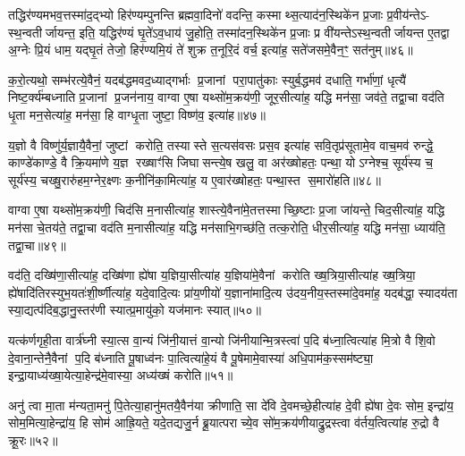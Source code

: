 {\anuvakamend[{निष्क्री॑णीष्व॒ दख्षि॑णाभिश्च वदन्ति॒ मन्य॑न्ते गन्ध॒र्वेभ्यो॑ ब॒हुत॑याः पिङ्गा॒क्ष्या दश॑ च॥६॥}]}

तद्धिर॑ण्यमभव॒त्तस्मा॑द॒द्भ्यो हिर॑ण्यम्पुनन्ति ब्रह्मवा॒दिनो॑ वदन्ति॒ कस्माथ्स॒त्याद॑न॒स्थिके॑न प्र॒जाः प्र॒वीय॑न्तेऽ- स्थ॒न्वतीर्जायन्त॒ इति॒ यद्धिर॑ण्यं घृ॒ते॑ऽव॒धाय॑ जु॒होति॒ तस्मा॑दन॒स्थिके॑न प्र॒जाः प्र वी॑यन्तेऽस्थ॒न्वतीर्जायन्त ए॒तद्वा अ॒ग्नेः प्रि॒यं धाम॒ यद्घृ॒तं तेजो॒ हिर॑ण्यमि॒यं ते॑ शुक्र त॒नूरि॒दं वर्च॒ इत्या॑ह॒ सते॑जसमे॒वैन॒ꣳ॒ सत॑नुम्॥४६॥

क॒रो॒त्यथो॒ सम्भ॑रत्ये॒वैनं॒ यदब॑द्धमवद॒ध्याद्गर्भाः प्र॒जानां परा॒पातु॑काः स्युर्ब॒द्धमव॑ दधाति॒ गर्भा॑णां॒ धृत्यै॑ निष्ट॒र्क्य॑म्बध्नाति प्र॒जानां प्र॒जन॑नाय॒ वाग्वा ए॒षा यथ्सो॑म॒क्रय॑णी॒ जूर॒सीत्या॑ह॒ यद्धि मन॑सा॒ जव॑ते॒ तद्वा॒चा वद॑ति धृ॒ता मन॒सेत्या॑ह॒ मन॑सा॒ हि वाग्धृ॒ता जुष्टा॒ विष्ण॑व॒ इत्या॑ह॥४७॥

य॒ज्ञो वै विष्णु॑र्य॒ज्ञायै॒वैनां॒ जुष्टां करोति॒ तस्यास्ते स॒त्यस॑वसः प्रस॒व इत्या॑ह सवि॒तृप्र॑सूतामे॒व वाच॒मव॑ रुन्द्धे॒ काण्डे॑काण्डे॒ वै क्रि॒यमा॑णे य॒ज्ञ रख्षाꣳ॑सि जिघासन्त्ये॒ष खलु॒ वा अर॑ख्षोहतः॒ पन्था॒ योऽग्नेश्च॒ सूर्य॑स्य च॒ सूर्य॑स्य॒ चख्षु॒रारु॑हम॒ग्नेर॒क्ष्णः क॒नीनि॑का॒मित्या॑ह॒ य ए॒वार॑ख्षोहतः॒ पन्था॒स्त स॒मारो॑हति॥४८॥

वाग्वा ए॒षा यथ्सो॑म॒क्रय॑णी॒ चिद॑सि म॒नासीत्या॑ह॒ शास्त्ये॒वैना॑मे॒तत्तस्माच्छि॒ष्टाः प्र॒जा जा॑यन्ते॒ चिद॒सीत्या॑ह॒ यद्धि मन॑सा चे॒तय॑ते॒ तद्वा॒चा वद॑ति म॒नासीत्या॑ह॒ यद्धि मन॑साभि॒गच्छ॑ति॒ तत्क॒रोति॒ धीर॒सीत्या॑ह॒ यद्धि मन॑सा॒ ध्याय॑ति॒ तद्वा॒चा॥४९॥

वद॑ति॒ दख्षि॑णा॒सीत्या॑ह॒ दख्षि॑णा ह्ये॑षा य॒ज्ञिया॒सीत्या॑ह य॒ज्ञिया॑मे॒वैनां करोति ख्ष॒त्रिया॒सीत्या॑ह ख्ष॒त्रिया॒ ह्ये॑षादि॑तिरस्युभ॒यतः॑शी॒र्\mbox{}ष्णीत्या॑ह॒ यदे॒वादि॒त्यः प्रा॑य॒णीयो॑ य॒ज्ञाना॑मादि॒त्य उ॑दय॒नीय॒स्तस्मा॑दे॒वमा॑ह॒ यदब॑द्धा॒ स्यादय॑ता स्या॒द्यत्प॑दिब॒द्धानु॒स्तर॑णी स्यात्प्र॒मायु॑को॒ यज॑मानः स्यात्॥५०॥

यत्क॑र्णगृही॒ता वार्त्र॑घ्नी स्या॒त्स वा॒न्यं जि॑नी॒यात्तं वा॒न्यो जि॑नीयान्मि॒त्रस्त्वा॑ प॒दि ब॑ध्ना॒त्वित्या॑ह मि॒त्रो वै शि॒वो दे॒वाना॒न्तेनै॒वैनां प॒दि ब॑ध्नाति पू॒षाध्व॑नः पा॒त्वित्या॑हे॒यं वै पू॒षेमामे॒वास्या॑ अधि॒पाम॑क॒स्सम॑ष्ट्या॒ इन्द्रा॒याध्य॑ख्षा॒येत्या॒हेन्द्र॑मे॒वास्या॒ अध्य॑ख्षं करोति॥५१॥

अनु॑ त्वा मा॒ता म॑न्यता॒मनु॑ पि॒तेत्या॒हानु॑मतयै॒वैन॑या क्रीणाति॒ सा दे॑वि दे॒वमच्छे॒हीत्या॑ह दे॒वी ह्ये॑षा दे॒वः सोम॒ इन्द्रा॑य॒ सोम॒मित्या॒हेन्द्रा॑य॒ हि सोम॑ आह्रि॒यते॒ यदे॒तद्यजु॒र्न ब्रू॒यात्पराच्ये॒व सो॑म॒क्रय॑णीयाद्रु॒द्रस्त्वा व॑र्तय॒त्वित्या॑ह रु॒द्रो वै क्रू॒रः॥५२॥

